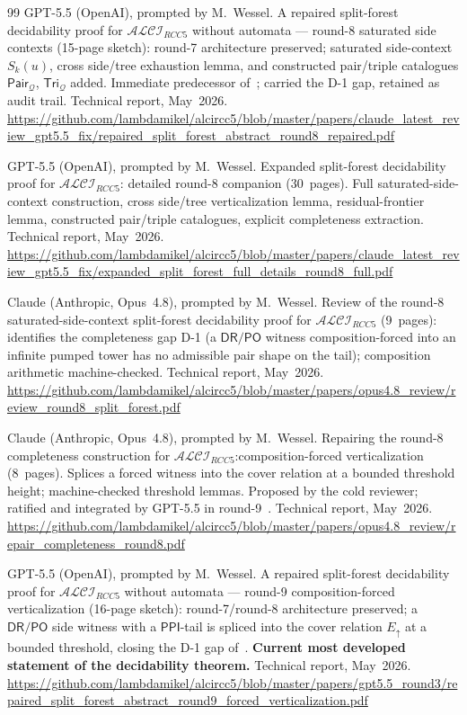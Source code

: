 \documentclass[
]{ceurart}
\theoremstyle{definition}
\newcommand{\ALCIRCC}[1]{\ensuremath{\mathcal{ALCI}_{\mathit{RCC#1}}}}
\newcommand{\DR}{\ensuremath{\mathsf{DR}}}
\newcommand{\PO}{\ensuremath{\mathsf{PO}}}
\newcommand{\PPI}{\ensuremath{\mathsf{PPI}}}
\newcommand{\Q}{\ensuremath{\mathcal Q}}
\newcommand{\Pair}{\ensuremath{\mathsf{Pair}}}
\newcommand{\Tri}{\ensuremath{\mathsf{Tri}}}
\newcommand{\Eup}{\ensuremath{E_{\uparrow}}}
\begin{document}
\begin{thebibliography}{99}
GPT-5.5 (OpenAI), prompted by M.\ Wessel.
\newblock A repaired split-forest decidability proof for
  $\ALCIRCC{5}$ without automata --- round-8 saturated side
  contexts (15-page sketch): round-7 architecture preserved;
  saturated side-context $S_k(u)$, cross side/tree exhaustion
  lemma, and constructed pair/triple catalogues
  $\Pair_\Q$, $\Tri_\Q$ added.  Immediate predecessor
  of~\cite{GPT55Round9Sketch}; carried the D-1 gap, retained as
  audit trail.
\newblock Technical report, May~2026.
\newblock \url{https://github.com/lambdamikel/alcircc5/blob/master/papers/claude_latest_review_gpt5.5_fix/repaired_split_forest_abstract_round8_repaired.pdf}

GPT-5.5 (OpenAI), prompted by M.\ Wessel.
\newblock Expanded split-forest decidability proof for
  $\ALCIRCC{5}$: detailed round-8 companion (30~pages).  Full
  saturated-side-context construction, cross side/tree
  verticalization lemma, residual-frontier lemma, constructed
  pair/triple catalogues, explicit completeness extraction.
\newblock Technical report, May~2026.
\newblock \url{https://github.com/lambdamikel/alcircc5/blob/master/papers/claude_latest_review_gpt5.5_fix/expanded_split_forest_full_details_round8_full.pdf}

Claude (Anthropic, Opus~4.8), prompted by M.\ Wessel.
\newblock Review of the round-8 saturated-side-context split-forest
  decidability proof for $\ALCIRCC{5}$ (9~pages): identifies the
  completeness gap D-1 (a $\DR/\PO$ witness composition-forced into
  an infinite pumped tower has no admissible pair shape on the
  tail); composition arithmetic machine-checked.
\newblock Technical report, May~2026.
\newblock \url{https://github.com/lambdamikel/alcircc5/blob/master/papers/opus4.8_review/review_round8_split_forest.pdf}

Claude (Anthropic, Opus~4.8), prompted by M.\ Wessel.
\newblock Repairing the round-8 completeness construction for
  $\ALCIRCC{5}$:\@ composition-forced verticalization (8~pages).
  Splices a forced witness into the cover relation at a bounded
  threshold height; machine-checked threshold lemmas.  Proposed by
  the cold reviewer; ratified and integrated by GPT-5.5 in
  round-9~\cite{GPT55Round9Sketch}.
\newblock Technical report, May~2026.
\newblock \url{https://github.com/lambdamikel/alcircc5/blob/master/papers/opus4.8_review/repair_completeness_round8.pdf}

GPT-5.5 (OpenAI), prompted by M.\ Wessel.
\newblock A repaired split-forest decidability proof for
  $\ALCIRCC{5}$ without automata --- round-9 composition-forced
  verticalization (16-page sketch): round-7/round-8 architecture
  preserved; a $\DR/\PO$ side witness with a $\PPI$-tail is spliced
  into the cover relation $\Eup$ at a bounded threshold, closing the
  D-1 gap of~\cite{Opus48Round8Review}.  \textbf{Current most
  developed statement of the decidability theorem.}
\newblock Technical report, May~2026.
\newblock \url{https://github.com/lambdamikel/alcircc5/blob/master/papers/gpt5.5_round3/repaired_split_forest_abstract_round9_forced_verticalization.pdf}


\end{thebibliography}
\end{document}
